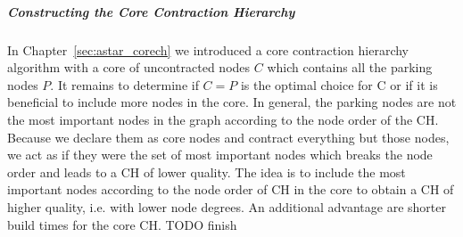 \subparagraph{Constructing the Core Contraction Hierarchy}
In Chapter~\ref{sec:astar_corech} we introduced a core contraction hierarchy algorithm with a core of uncontracted nodes $C$ which contains all the parking nodes $P$. It remains to determine if $C=P$ is the optimal choice for C or if it is beneficial to include more nodes in the core. In general, the parking nodes are not the most important nodes in the graph according to the node order of the CH. Because we declare them as core nodes and contract everything but those nodes, we act as if they were the set of most important nodes which breaks the node order and leads to a CH of lower quality. The idea is to include the most important nodes according to the node order of CH in the core to obtain a CH of higher quality, i.e. with lower node degrees. An additional advantage are shorter build times for the core CH. TODO finish